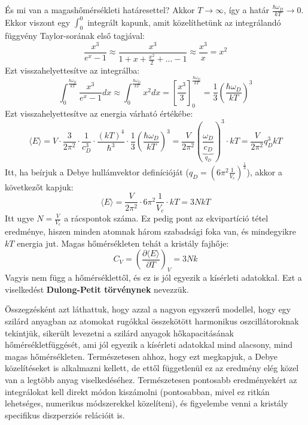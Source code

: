 \documentclass[../main.tex]{subfiles}
\begin{document}
És mi van a magashőmérsékleti határesettel? Akkor $T \to \infty$, így a határ $\frac{\hbar \omega_D}{k T} \to 0$. Ekkor viszont egy $\int_0^0$ integrált kapunk, amit közelíthetünk az integrálandó függvény
Taylor-sorának első tagjával:
\begin{equation}
    \frac{x^3}{e^x - 1} \approx \frac{x^3}{1 + x + \frac{x^2}{2} + ... - 1} \approx \frac{x^3}{x} = x^2
\end{equation}
Ezt visszahelyettesítve az integrálba:
\begin{equation}
    \int_0^{\frac{\hbar \omega_D}{k T}} \frac{x^3}{e^x - 1} dx \approx \int_0^{\frac{\hbar \omega_D}{k T}} x^2 dx = \left[\frac{x^3}{3}\right]_0^{\frac{\hbar \omega_D}{k T}} = \frac{1}{3} \left(\frac{\hbar \omega_D}{k T}\right)^3
\end{equation}
Ezt visszahelyettesítve az energia várható értékébe:
\begin{equation}
    \langle E \rangle = V \cdot \frac{3}{2 \pi^2} \cdot \frac{1}{c_D^3} \cdot \frac{(k T)^4}{\hbar^3} \cdot \frac{1}{3} \left(\frac{\hbar \omega_D}{k T}\right)^3 = \frac{V}{2 \pi^2} \left(\underbrace{\frac{\omega_D}{c_D}}_{q_D}\right)^3 \cdot k T = \frac{V}{2 \pi^2} q_D^3 k T
\end{equation}
Itt, ha beírjuk a Debye hullámvektor definícióját ($q_D = \left(6 \pi^2 \frac{1}{V_c}\right)^{\frac{1}{3}}$), akkor a következőt kapjuk:
\begin{equation}
    \langle E \rangle = \frac{V}{2 \pi^2} \cdot 6 \pi^2 \frac{1}{V_c} \cdot k T = 3 N k T
\end{equation}
Itt ugye $N = \frac{V}{V_c}$ a rácspontok száma. Ez pedig pont az ekvipartíció tétel eredménye, hiszen minden atomnak három szabadsági foka van, és mindegyikre $k T$ energia jut.
Magas hőmérsékleten tehát a kristály fajhője:
\begin{equation}
    C_V = \left(\frac{\partial \langle E \rangle}{\partial T}\right)_V = 3 N k
\end{equation}
Vagyis nem függ a hőmérséklettől, és ez is jól egyezik a kísérleti adatokkal. Ezt a viselkedést \textbf{Dulong-Petit törvénynek} nevezzük.

Összegzésként azt láthattuk, hogy azzal a nagyon egyszerű modellel, hogy egy szilárd anyagban az atomokat rugókkal összekötött harmonikus oszcillátoroknak tekintjük,
sikerült levezetni a szilárd anyagok hőkapacitásának hőmérsékletfüggését, ami jól egyezik a kísérleti adatokkal mind alacsony, mind magas hőmérsékleten. Természetesen ahhoz, hogy ezt megkapjuk,
a Debye közelítéseket is alkalmazni kellett, de ettől függetlenül ez az eredmény elég közel van a legtöbb anyag viselkedéséhez. Természetesen pontosabb eredményekért az integrálokat kell direkt módon 
kiszámolni (pontosabban, mivel ez ritkán lehetséges, numerikus módszerekkel közelíteni), és figyelembe venni a kristály specifikus diszperziós relációit is.
\end{document}
